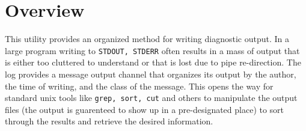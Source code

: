 \section{Overview}

This utility provides an organized method for writing diagnostic
output.  In a large program
writing to {\tt STDOUT, STDERR} often results in a mass of output that
is either too cluttered to understand or that is lost due to pipe 
re-direction.  The log provides a message output channel that organizes
its output by the author, the time of writing, and the class of the 
message.  This opens the way for standard unix tools like {\tt grep, sort, cut}
and others to manipulate the output files (the output is guarenteed to show
up in a pre-designated place) to sort through the results and retrieve
the desired information.

